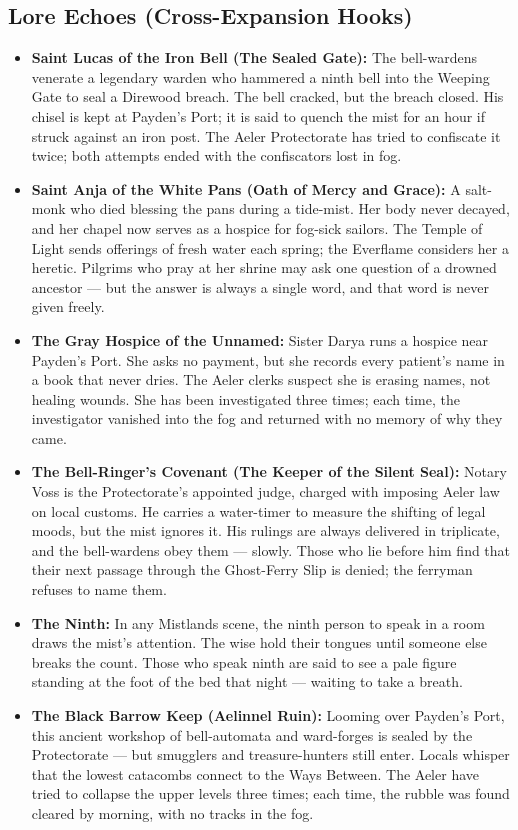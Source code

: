\subsection*{Lore Echoes (Cross-Expansion Hooks)}
\begin{itemize}
  \item \textbf{Saint Lucas of the Iron Bell (The Sealed Gate):} The bell-wardens venerate a legendary warden who hammered a ninth bell into the Weeping Gate to seal a Direwood breach. The bell cracked, but the breach closed. His chisel is kept at Payden's Port; it is said to quench the mist for an hour if struck against an iron post. The Aeler Protectorate has tried to confiscate it twice; both attempts ended with the confiscators lost in fog.
  \item \textbf{Saint Anja of the White Pans (Oath of Mercy and Grace):} A salt-monk who died blessing the pans during a tide-mist. Her body never decayed, and her chapel now serves as a hospice for fog-sick sailors. The Temple of Light sends offerings of fresh water each spring; the Everflame considers her a heretic. Pilgrims who pray at her shrine may ask one question of a drowned ancestor --- but the answer is always a single word, and that word is never given freely.
  \item \textbf{The Gray Hospice of the Unnamed:} Sister Darya runs a hospice near Payden's Port. She asks no payment, but she records every patient's name in a book that never dries. The Aeler clerks suspect she is erasing names, not healing wounds. She has been investigated three times; each time, the investigator vanished into the fog and returned with no memory of why they came.
  \item \textbf{The Bell-Ringer's Covenant (The Keeper of the Silent Seal):} Notary Voss is the Protectorate's appointed judge, charged with imposing Aeler law on local customs. He carries a water-timer to measure the shifting of legal moods, but the mist ignores it. His rulings are always delivered in triplicate, and the bell-wardens obey them --- slowly. Those who lie before him find that their next passage through the Ghost-Ferry Slip is denied; the ferryman refuses to name them.
  \item \textbf{The Ninth:} In any Mistlands scene, the ninth person to speak in a room draws the mist's attention. The wise hold their tongues until someone else breaks the count. Those who speak ninth are said to see a pale figure standing at the foot of the bed that night --- waiting to take a breath.
  \item \textbf{The Black Barrow Keep (Aelinnel Ruin):} Looming over Payden's Port, this ancient workshop of bell-automata and ward-forges is sealed by the Protectorate --- but smugglers and treasure-hunters still enter. Locals whisper that the lowest catacombs connect to the Ways Between. The Aeler have tried to collapse the upper levels three times; each time, the rubble was found cleared by morning, with no tracks in the fog.
\end{itemize}

